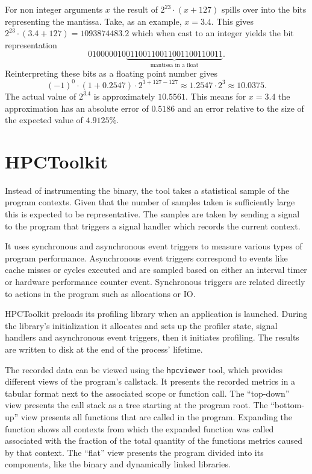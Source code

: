 \documentclass[a4paper, 11pt]{memoir}
\begin{document}
    For non integer arguments $x$ the result of $2^{23}\cdot(x + 127)$ spills over into the bits representing the mantissa.
    Take, as an example, $x = 3.4$. This gives $2^{23} \cdot (3.4 + 127) = 1093874483.2$ which when cast to an integer
    yields the bit representation
    \begin{equation}
        010000010\underbrace{01100110011001100110011}_{\text{mantissa in a float}}.
    \end{equation}
    Reinterpreting these bits as a floating point number gives
    \begin{equation}
        (-1)^0 \cdot (1 + 0.2547) \cdot 2^{3 + 127 - 127} \approx 1.2547 \cdot 2^3 \approx 10.0375.
    \end{equation}
    The actual value of $2^{3.4}$ is approximately $10.5561$. This means for $x = 3.4$ the approximation has an absolute
    error of $0.5186$ and an error relative to the size of the expected value of $4.9125\%$.

    \section{HPCToolkit}
    \label{sec:hpctoolkit_explanation}
    Instead of instrumenting the binary, the tool takes a statistical sample of the program contexts. Given that the number
    of samples taken is sufficiently large this is expected to be representative. The samples are taken by sending a signal
    to the program that triggers a signal handler which records the current context.

    It uses synchronous and asynchronous event triggers to measure various types of program performance. Asynchronous
    event triggers correspond to events like cache misses or cycles executed and are sampled based on either an interval
    timer or hardware performance counter event. Synchronous triggers are related directly to actions in the program such
    as allocations or IO.

    HPCToolkit preloads its profiling library when an application is launched. During the library's initialization it
    allocates and sets up the profiler state, signal handlers and asynchronous event triggers, then it initiates profiling.
    The results are written to disk at the end of the process' lifetime.

    The recorded data can be viewed using the \texttt{hpcviewer} tool, which provides different views of the
    program's callstack. It presents the recorded metrics in a tabular format next to the associated scope or function
    call. The \enquote{top-down} view presents the call stack as a tree starting at the program root. The \enquote{bottom-up}
    view presents all functions that are called in the program. Expanding the function shows all contexts from which the
    expanded function was called associated with the fraction of the total quantity of the functions metrics caused by
    that context. The \enquote{flat} view presents the program divided into its components, like the binary and dynamically
    linked libraries.
\end{document}
